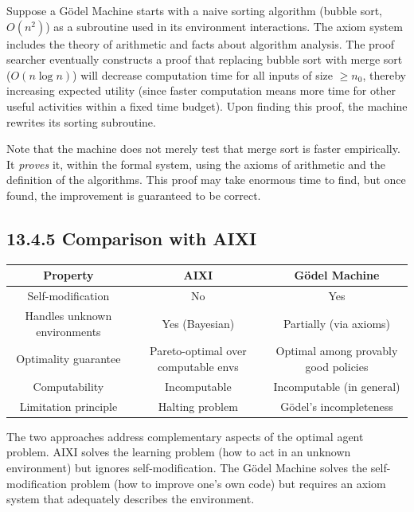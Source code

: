 \begin{example}
Suppose a Gödel Machine starts with a naive sorting algorithm (bubble sort, $O(n^2)$) as a subroutine used in its environment interactions. The axiom system includes the theory of arithmetic and facts about algorithm analysis. The proof searcher eventually constructs a proof that replacing bubble sort with merge sort ($O(n \log n)$) will decrease computation time for all inputs of size $\geq n_0$, thereby increasing expected utility (since faster computation means more time for other useful activities within a fixed time budget). Upon finding this proof, the machine rewrites its sorting subroutine.

Note that the machine does not merely test that merge sort is faster empirically. It \textit{proves} it, within the formal system, using the axioms of arithmetic and the definition of the algorithms. This proof may take enormous time to find, but once found, the improvement is guaranteed to be correct.
\end{example}

\subsection{13.4.5 Comparison with AIXI}

\begin{center}
\begin{tabular}{ccc}
\toprule
Property & AIXI & Gödel Machine \\
\midrule
Self-modification & No & Yes \\
Handles unknown environments & Yes (Bayesian) & Partially (via axioms) \\
Optimality guarantee & Pareto-optimal over computable envs & Optimal among provably good policies \\
Computability & Incomputable & Incomputable (in general) \\
Limitation principle & Halting problem & Gödel's incompleteness \\
\bottomrule
\end{tabular}
\end{center}

The two approaches address complementary aspects of the optimal agent problem. AIXI solves the learning problem (how to act in an unknown environment) but ignores self-modification. The Gödel Machine solves the self-modification problem (how to improve one's own code) but requires an axiom system that adequately describes the environment.



